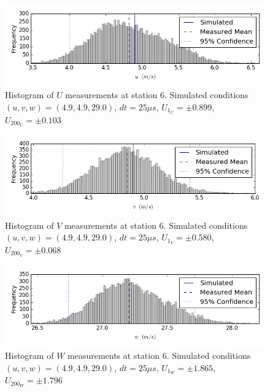\begin{figure}[H]
\centering
\includegraphics[width=6in]{figs/Ely_May28th06001/uncertainty_Ely_May28th06001_U}
\caption{Histogram of $U$ measurements at station 6. Simulated conditions $(u,v,w)=(4.9, 4.9, 29.0)$, $dt=25 \mu s$, $U_1_U=\pm 0.899$, $U_200_U=\pm 0.103$}
\label{fig:uncertainty_Ely_May28th06001_U}
\end{figure}


\begin{figure}[H]
\centering
\includegraphics[width=6in]{figs/Ely_May28th06001/uncertainty_Ely_May28th06001_V}
\caption{Histogram of $V$ measurements at station 6. Simulated conditions $(u,v,w)=(4.9, 4.9, 29.0)$, $dt=25 \mu s$, $U_1_V=\pm 0.580$, $U_200_V=\pm 0.068$}
\label{fig:uncertainty_Ely_May28th06001_V}
\end{figure}


\begin{figure}[H]
\centering
\includegraphics[width=6in]{figs/Ely_May28th06001/uncertainty_Ely_May28th06001_W}
\caption{Histogram of $W$ measurements at station 6. Simulated conditions $(u,v,w)=(4.9, 4.9, 29.0)$, $dt=25 \mu s$, $U_1_W=\pm 1.865$, $U_200_W=\pm 1.796$}
\label{fig:uncertainty_Ely_May28th06001_W}
\end{figure}


